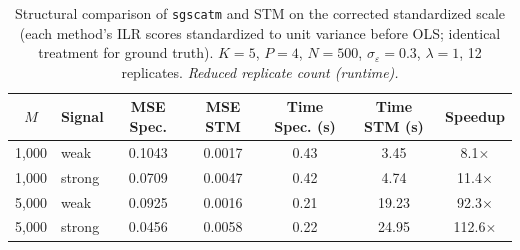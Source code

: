 \begin{table}[t]
\centering
\caption{Structural comparison of \texttt{sgscatm} and STM on the corrected standardized scale (each method's ILR scores standardized to unit variance before OLS; identical treatment for ground truth). $K=5$, $P=4$, $N=500$, $\sigma_\varepsilon=0.3$, $\lambda=1$, 12 replicates. \emph{Reduced replicate count (runtime).}}
\label{tab:block3}
\begin{tabular}{clccccc}
\toprule
$M$ & Signal & MSE Spec. & MSE STM & Time Spec. (s) & Time STM (s) & Speedup \\
\midrule
1,000 & weak & 0.1043 & 0.0017 & 0.43 & 3.45 & 8.1$\times$ \\
1,000 & strong & 0.0709 & 0.0047 & 0.42 & 4.74 & 11.4$\times$ \\
5,000 & weak & 0.0925 & 0.0016 & 0.21 & 19.23 & 92.3$\times$ \\
5,000 & strong & 0.0456 & 0.0058 & 0.22 & 24.95 & 112.6$\times$ \\
\bottomrule
\end{tabular}
\end{table}
